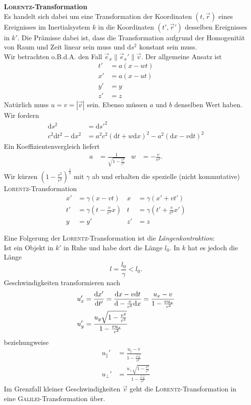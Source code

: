 \textbf{\textsc{Lorentz}-Transformation}\\

Es handelt sich dabei um eine Transformation der Koordinaten $(t,\vec{r})$ eines Ereignisses im Inertialsystem $k$ in die Koordinaten $(t',\vec{r}')$ desselben Ereignisses in $k'$. Die Prämisse dabei ist, dass die Transformation aufgrund der Homogenität von Raum und Zeit linear sein muss und $\mathrm{d}s^2$ konstant sein muss. \\
Wir betrachten o.B.d.A. den Fall $\vec{e}_x\parallel\vec{e}_x'\parallel\vec{v}$. Der allgemeine Ansatz ist
\begin{align*}
t'&=a(x-wt)\\
x'&=a(x-ut)\\
y'&=y\\
z'&=z
\end{align*}
Natürlich muss $u=v=|\vec{v}|$ sein. Ebenso müssen $a$ und $b$ denselben Wert haben. Wir fordern
\begin{align*}
\mathrm{d}s^2 &=\mathrm{d}s'^2\\
c^2\mathrm{d}t^2-\mathrm{d}x^2 &=a^2c^2(\mathrm{d}t+w\mathrm{d}x)^2 - a^2(\mathrm{d}x-v\mathrm{d}t)^2
\end{align*}
Ein Koeffizientenvergleich liefert 
\begin{align*}
a&=\frac{1}{\sqrt{1-\frac{v^2}{c^2}}} & w&=-\frac{v}{c^2}.
\end{align*}
Wir kürzen $(1-\frac{v^2}{c^2})^{\frac{1}{2}}$ mit $\gamma$ ab und erhalten die spezielle (nicht kommutative) \textsc{Lorentz}-Transformation
\begin{align*}
x'&=\gamma(x-vt) & x &=\gamma(x'+vt')\\
t'&=\gamma\left(t-\frac{v}{c^2}x\right) & t &=\gamma\left(t'+\frac{v}{c^2}x'\right)\\
y &=y'   & z' &=z
\end{align*}

Eine Folgerung der \textsc{Lorentz}-Transformation ist die \emph{Längenkontraktion}:\\
Ist ein Objekt in $k'$ in Ruhe und habe dort die Länge $l_0$. In $k$ hat es jedoch die Länge
\begin{equation*}
l = \frac{l_0}{\gamma} < l_0.
\end{equation*}
Geschwindigkeiten transformieren nach
\begin{align*}
u_x' &= \frac{\mathrm{d}{x'}}{\mathrm{d}{t'}}=\frac{\mathrm{d}x-v\mathrm{d}t}{\mathrm{d}-\frac{v}{c^2}\mathrm{d}x}=\frac{u_x-v}{1-\frac{vu_x}{c^2}}\\
u_y' &=\frac{u_y\sqrt{1-\frac{v^2}{c^2}}}{1-\frac{vu_x}{c^2}}
\end{align*}
beziehungweise
\begin{align*}
u_\parallel' &=\frac{u_\parallel-v}{1-\frac{\vec{v}\vec{u}}{c^2}}\\
u_\perp' &= \frac{u_\perp\sqrt{1-\frac{v^2}{c^2}}}{1-\frac{\vec{v}\vec{u}}{c^2}}
\end{align*}
Im Grenzfall kleiner Geschwindigkeiten $\vec{v}$ geht die \textsc{Lorentz}-Transformation in eine \textsc{Galilei}-Transformation über.

